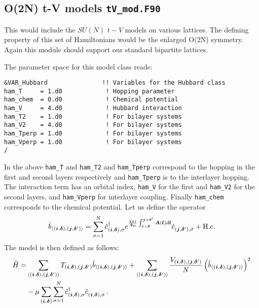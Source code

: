 \subsection{  O(2N)  t-V models  \texttt{tV\_mod.F90}}

This would include the $SU(N)$  $t-V$ models on various lattices.  The defining property of this set of Hamiltonians would be the enlarged O(2N) symmetry.  Again  this   module should support our standard bipartite lattices. 

The parameter space for this model class  reads: 

\begin{lstlisting}[style=fortran,escapechar=\#,breaklines=true]
&VAR_Hubbard               !! Variables for the Hubbard class
ham_T     = 1.d0            ! Hopping parameter
ham_chem  = 0.d0            ! Chemical potential
ham_V     = 4.d0            ! Hubbard interaction
ham_T2    = 1.d0            ! For bilayer systems
ham_V2    = 4.d0            ! For bilayer systems
ham_Tperp = 1.d0            ! For bilayer systems
ham_Vperp = 1.d0            ! For bilayer systems
/

\end{lstlisting}
In the above   \texttt{ham\_T} and \texttt{ham\_T2} and \texttt{ham\_Tperp}   correspond to the hopping in the first and second layers respectively and  \texttt{ham\_Tperp}   is to the interlayer hopping.   The interaction term has an orbital index, 
\texttt{ham\_V}  for the first and  \texttt{ham\_V2}  for the second layers,  and \texttt{ham\_Vperp} for interlayer coupling.  Finally   \texttt{ham\_chem}  corresponds to the chemical potential. Let us define the operator
\begin{equation}
\hat{b}_{\langle (\boldsymbol{i},\boldsymbol{\delta}), (\boldsymbol{j},\boldsymbol{\delta}') \rangle} =  \sum_{\sigma =1}^{N}    \hat{c}^{\dagger}_{(\boldsymbol{i},\boldsymbol{\delta}), \sigma }   e^{\frac{2 \pi i}{\Phi_0} \int_{\boldsymbol{i} + \boldsymbol{\delta}}^{\boldsymbol{j} + \boldsymbol{\delta}'}  
	\boldsymbol{A}(\boldsymbol{l})  d \boldsymbol{l}} \hat{c}^{}_{(\boldsymbol{j},\boldsymbol{\delta}'),\sigma} 
+ \textrm{H.c.}
\end{equation}
The model is then defined as follows:
\begin{align}
\hat{H}= & \sum_{\langle (\ve{i},\ve{\delta}), (\ve{j},\ve{\delta}') \rangle}   T_{(\ve{i},\ve{\delta}), (\ve{j},\ve{\delta}')}    \hat{b}_{\langle (\ve{i},\ve{\delta}), (\ve{j},\ve{\delta}') \rangle}
+ \sum_{\langle (\ve{i},\ve{\delta}), (\ve{j},\ve{\delta}') \rangle}  \frac{V_{(\ve{i},\ve{\delta}), (\ve{j},\ve{\delta}')}}{N} \left(  \hat{b}_{\langle (\ve{i},\ve{\delta}), (\ve{j},\ve{\delta}') \rangle}  \right)^2  \nonumber \\
& - \mu \sum_{(\ve{i},\ve{\delta})}  \sum_{\sigma =1}^{N} \hat{c}^{\dagger}_{(\vec{i},\ve{\delta}),\sigma } \hat{c}^{\phantom\dagger}_{(\vec{i},\ve{\delta}),\sigma } \,.
\end{align}
